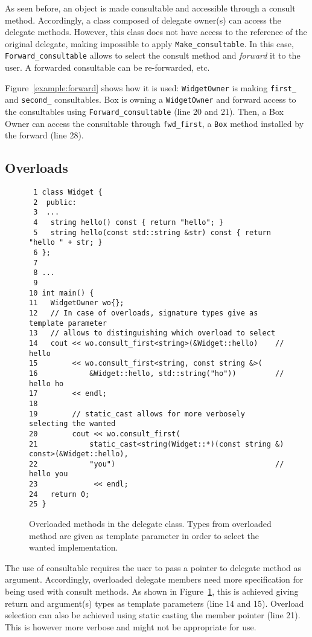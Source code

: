 \documentclass{article}
\begin{document}
As seen before, an object is made consultable and accessible through a consult method. Accordingly, a class composed of delegate owner(s) can access the delegate methods. However, this class does not have access to the reference of the original delegate, making impossible to apply \verb+Make_consultable+. In this case, \verb+Forward_consultable+ allows to select the consult method and \textit{forward} it to the user. A forwarded consultable can be re-forwarded, etc. 

Figure~\ref{example:forward} shows how it is used: \verb+WidgetOwner+ is making \verb+first_+ and \verb+second_+ consultables. Box is owning a \verb+WidgetOwner+ and forward access to the consultables using \verb+Forward_consultable+ (line 20 and 21). Then, a Box Owner can access the consultable through \verb+fwd_first+, a \verb+Box+ method installed by the forward (line 28).   

\subsection{Overloads}
\begin{figure}[ht]
{\small
\begin{lstlisting}
 1 class Widget {
 2  public:
 3  ...
 4   string hello() const { return "hello"; }
 5   string hello(const std::string &str) const { return "hello " + str; }
 6 };
 7 
 8 ...
 9 
10 int main() {
11   WidgetOwner wo{};
12   // In case of overloads, signature types give as template parameter
13   // allows to distinguishing which overload to select
14   cout << wo.consult_first<string>(&Widget::hello)    // hello
15        << wo.consult_first<string, const string &>(
16            &Widget::hello, std::string("ho"))         // hello ho
17        << endl;
18        
19        // static_cast allows for more verbosely selecting the wanted
20        cout << wo.consult_first(
21            static_cast<string(Widget::*)(const string &) const>(&Widget::hello),
22            "you")                                     // hello you
23             << endl;
24   return 0;
25 }
\end{lstlisting}}
\cprotect\caption{Overloaded methods in the delegate class. Types from overloaded method are given as template parameter in order to select the wanted implementation.}
\label{example:overload}
\end{figure}

The use of consultable requires the user to pass a pointer to delegate method as argument. Accordingly, overloaded delegate members need more specification for being used with consult methods. As shown in Figure~\ref{example:overload}, this is achieved giving return and argument(s) types as template parameters (line 14 and 15). Overload selection can also be achieved using static casting the member pointer (line 21). This is however more verbose and might not be appropriate for use.  
\end{document}
